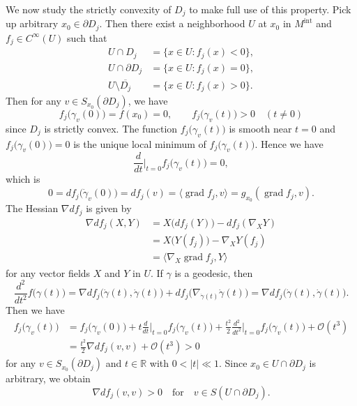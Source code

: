 \documentclass[a4paper,11pt,reqno]{amsart}
\numberwithin{equation}{section}
\theoremstyle{definition}
\theoremstyle{remark}
\begin{document}
%
%
\par
%
%
We now study the strictly convexity of $D_j$ to make full use of this property. 
Pick up arbitrary $x_0 \in \partial{D_j}$. 
Then there exist 
a neighborhood $U$ at $x_0$ in $M^\text{int}$ 
and $f_j \in C^\infty(U)$ such that 
%
%
\begin{align*}
  U{\cap}D_j
& =
  \{x{\in}U : f_j(x)<0\},
\\
  U{\cap}\partial{D_j}
& =
  \{x{\in}U : f_j(x)=0\},
\\
  U\setminus\overline{D_j}
& =
  \{x{\in}U : f_j(x)>0\}.
\end{align*}
%
%
Then for any $v \in S_{x_0}(\partial{D_j})$, we have 
%
%
$$
f_j\bigl(\gamma_v(0)\bigr)=f(x_0)=0,
\qquad
f_j\bigl(\gamma_v(t)\bigr)>0
\quad
(t\ne0)
$$
%
%
since $D_j$ is strictly convex. 
The function $f_j\bigl(\gamma_v(t)\bigr)$ is smooth near $t=0$ and $f_j\bigl(\gamma_v(0)\bigr)=0$ 
is the unique local minimum of $f_j\bigl(\gamma_v(t)\bigr)$. Hence we have 
%
%
$$
\frac{d}{dt}\bigg\vert_{t=0}f_j\bigl(\gamma_v(t)\bigr)=0,
$$
%
%
which is 
%
%
$$
0
=
df_j\bigl(\dot{\gamma}_v(0)\bigr)
=
df_j(v)
=
\langle\operatorname{grad}f_j,v\rangle
=
g_{x_0}(\operatorname{grad}f_j,v).
$$
%
%
The Hessian $\nabla{df_j}$ is given by 
%
%
\begin{align*}
  \nabla{df_j}(X,Y)
& =
  X\bigl(df_j(Y)\bigr)-df_j(\nabla_XY)
\\
& =
  X\bigl(Y(f_j)\bigr)-\nabla_XY(f_j)
\\
& =
  \langle\nabla_X\operatorname{grad}f_j,Y\rangle  
\end{align*}
%
%
for any vector fields $X$ and $Y$ in $U$. 
If $\gamma$ is a geodesic, then 
%
%
$$
\frac{d^2}{dt^2}
f\bigl(\gamma(t)\bigr)
=
\nabla{df_j}\bigl(\dot{\gamma}(t),\dot{\gamma}(t)\bigr)
+
df_j\bigl(\nabla_{\dot{\gamma}(t)}\dot{\gamma}(t)\bigr)
=
\nabla{df_j}\bigl(\dot{\gamma}(t),\dot{\gamma}(t)\bigr). 
$$
%
%
Then we have 
%
%
\begin{align*}
  f_j\bigl(\gamma_v(t)\bigr)
& =
  f_j\bigl(\gamma_v(0)\bigr)
  +
  t
  \frac{d}{dt}\bigg\vert_{t=0}
  f_j\bigl(\gamma_v(t)\bigr)
  +
  \frac{t^2}{2}
  \frac{d^2}{dt^2}\bigg\vert_{t=0}
  f_j\bigl(\gamma_v(t)\bigr)
  +
  \mathcal{O}(t^3)
\\
& =
  \frac{t^2}{2}\nabla{df_j}(v,v)+\mathcal{O}(t^3)
  >0 
\end{align*}
%
%
for any $v \in S_{x_0}(\partial{D_j})$ 
and $t\in\mathbb{R}$ with $0<\lvert{t}\rvert\ll1$. 
Since $x_0 \in U{\cap}\partial{D_j}$ is arbitrary, we obtain
%
%
\begin{equation}
\nabla{df_j}(v,v)>0
\quad\text{for}\quad
v \in S(U{\cap}\partial{D_j}).
\label{equation:hessian} 
\end{equation} 
\end{document}
